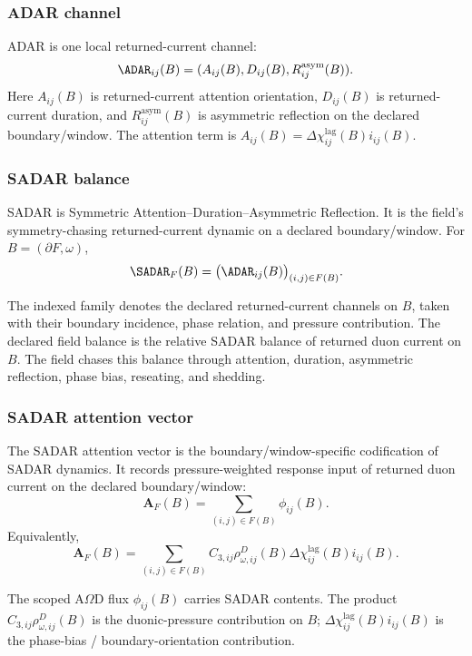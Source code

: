 \subsubsection{ADAR channel}
\label{subsec:adar-channel}
\begin{definition}[ADAR]
ADAR is one local returned-current channel:
\begin{equation}
\ADAR_{ij}(B)=(A_{ij}(B),D_{ij}(B),R^{\mathrm{asym}}_{ij}(B)).
\label{eq:adar-channel}
\end{equation}
Here \(A_{ij}(B)\) is returned-current attention orientation, \(D_{ij}(B)\) is returned-current duration, and \(R_{ij}^{\mathrm{asym}}(B)\) is asymmetric reflection on the declared boundary/window. The attention term is \(A_{ij}(B)=\Delta\chi^{\mathrm{lag}}_{ij}(B)i_{ij}(B)\).
\end{definition}

\subsubsection{SADAR balance}
\label{subsec:sadar-balance}
\begin{definition}[SADAR]
SADAR is Symmetric Attention--Duration--Asymmetric Reflection. It is the field's symmetry-chasing returned-current dynamic on a declared boundary/window. For \(B=(\partial F,\omega)\),
\begin{equation}
\SADAR_F(B)=
\big(\ADAR_{ij}(B)\big)_{(i,j)\in F(B)}.
\label{eq:sadar-field}
\end{equation}
\end{definition}
The indexed family denotes the declared returned-current channels on \(B\), taken with their boundary incidence, phase relation, and pressure contribution. The declared field balance is the relative SADAR balance of returned duon current on \(B\). The field chases this balance through attention, duration, asymmetric reflection, phase bias, reseating, and shedding.

\subsubsection{SADAR attention vector}
\label{subsec:sadar-attention-vector}
\begin{definition}
The SADAR attention vector is the boundary/window-specific codification of SADAR dynamics. It records pressure-weighted response input of returned duon current on the declared boundary/window:
\begin{equation}
\mathbf A_F(B)=
\sum_{(i,j)\in F(B)}
\phi_{ij}(B).
\label{eq:sadar-attention-vector}
\end{equation}
Equivalently,
\begin{equation}
\mathbf A_F(B)=
\sum_{(i,j)\in F(B)}
C_{3,ij}\rho^D_{\omega,ij}(B)
\Delta\chi^{\mathrm{lag}}_{ij}(B)i_{ij}(B).
\label{eq:sadar-attention-vector-expanded}
\end{equation}
\end{definition}
The scoped A\(\Omega\)D flux \(\phi_{ij}(B)\) carries SADAR contents. The product \(C_{3,ij}\rho^D_{\omega,ij}(B)\) is the duonic-pressure contribution on \(B\); \(\Delta\chi^{\mathrm{lag}}_{ij}(B)i_{ij}(B)\) is the phase-bias / boundary-orientation contribution.


